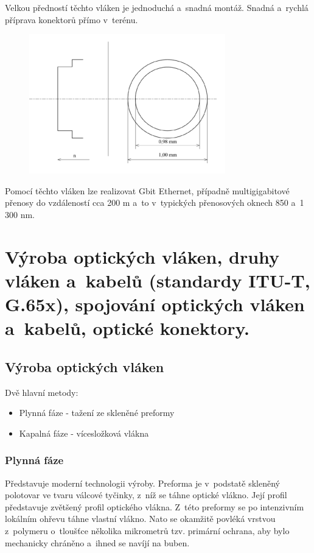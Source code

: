 Velkou předností těchto vláken je jednoduchá a~snadná montáž. Snadná a~rychlá příprava konektorů přímo v~terénu.

\begin{figure}[!ht]
  \begin{center}
    \includegraphics[scale=1]{obrazky/polym.png}
  \end{center}
\end{figure}

Pomocí těchto vláken lze realizovat Gbit Ethernet, případně multigigabitové přenosy do vzdáleností cca 200 m a~to v~typických přenosových oknech 850 a~1 300 nm.

\clearpage
\section{Výroba optických vláken, druhy vláken a~kabelů (standardy ITU-T, G.65x), spojování optických vláken a~kabelů, optické konektory.}

\subsection{Výroba optických vláken}
Dvě hlavní metody:
\begin{itemize}
  \item Plynná fáze - tažení ze skleněné preformy
  \item Kapalná fáze - vícesložková vlákna
\end{itemize}

\subsubsection{Plynná fáze}
Představuje moderní technologii výroby. Preforma je v~podstatě skleněný polotovar ve tvaru válcové tyčinky, z~níž se táhne optické vlákno. Její profil představuje zvětšený profil optického vlákna. Z~této preformy se po intenzivním lokálním ohřevu táhne vlastní vlákno. Nato se okamžitě povléká vrstvou z~polymeru o~tloušťce několika mikrometrů tzv. primární ochrana, aby bylo mechanicky chráněno a~ihned se navíjí na buben.

